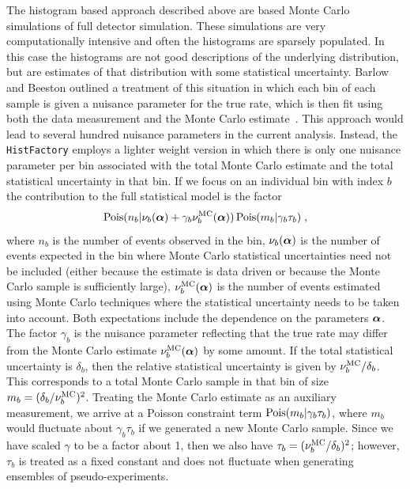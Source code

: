 \documentclass{cernrep}
\def\vec#1{\ifmmode
\mathchoice{\mbox{\boldmath$\displaystyle\bf#1$}}
{\mbox{\boldmath$\textstyle\bf#1$}}
{\mbox{\boldmath$\scriptstyle\bf#1$}}
{\mbox{\boldmath$\scriptscriptstyle\bf#1$}}\else
{\mbox{\boldmath$\bf#1$}}\fi}
\newcommand{\Pois}{{\ensuremath{\rm Pois}}}
\begin{document}
The histogram based approach described above are based Monte Carlo simulations of full detector simulation.  These simulations are very computationally intensive and often the histograms are sparsely populated.  In this case the histograms are not good descriptions of the underlying distribution, but are estimates of that distribution with some statistical uncertainty.  Barlow and Beeston outlined a treatment of this situation in which each bin of each sample is given a nuisance parameter for the true rate, which is then fit using both the data measurement and the Monte Carlo estimate~\cite{Barlow:1993dm}.  This approach would lead to several hundred nuisance parameters in the current analysis.  Instead, the \texttt{HistFactory} employs a lighter weight version in which there is only one nuisance parameter per bin associated with the total Monte Carlo estimate  and the total statistical uncertainty in that bin.  If we focus on an individual bin with index $b$ the contribution to the full statistical model is the factor
\begin{equation}
\Pois(n_b | \nu_b(\vec\alpha) + \gamma_b \nu_b^{\rm MC}(\vec\alpha)) \,  \Pois(m_b | \gamma_b \tau_b) \;,
\end{equation}
where $n_b$ is the number of events observed in the bin, $\nu_b(\vec\alpha)$ is the number of events expected in the bin where Monte Carlo statistical uncertainties need not be included (either because the estimate is data driven or because the Monte Carlo sample is sufficiently large), $\nu_b^{\rm MC}(\vec\alpha)$ is the number of events estimated using Monte Carlo techniques where the statistical uncertainty needs to be taken into account.  Both expectations include the dependence on the parameters $\vec\alpha$.  The factor $\gamma_b$ is the nuisance parameter reflecting that the true rate may differ from the Monte Carlo estimate $\nu_b^{\rm MC}(\vec\alpha) $ by some amount.  If the total statistical uncertainty is $\delta_b$, then the relative statistical uncertainty is given by $\nu_b^{\rm MC}/\delta_b$.  This corresponds to a total Monte Carlo sample in that bin of size $m_b =  (\delta_b/\nu_b^{\rm MC})^2$.  Treating the Monte Carlo estimate as an auxiliary measurement, we arrive at a Poisson constraint term $ \Pois(m_b | \gamma_b \tau_b)$, where $m_b$ would fluctuate about $\gamma_b \tau_b$ if we generated a new Monte Carlo sample.  Since we have scaled $\gamma$ to be a factor about 1, then we also have $\tau_b=(\nu_b^{\rm MC}/\delta_b)^2$; however, $\tau_b$ is treated as a fixed constant and does not fluctuate when generating ensembles of pseudo-experiments.
\end{document}
